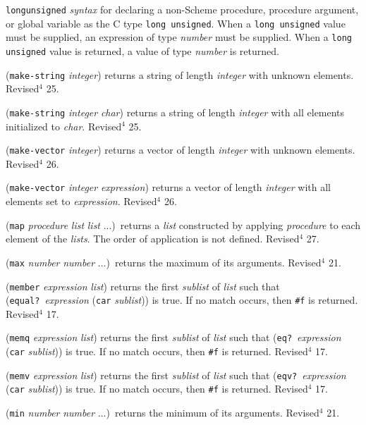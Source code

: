\documentclass[10pt,twocolumn]{article}
\begin{document}
\texttt{longunsigned} \emph{syntax} for declaring a non-Scheme procedure,
procedure argument, or global variable as the C type \texttt{long
unsigned}. When a \texttt{long unsigned} value must be supplied, an
expression of type \emph{number} must be supplied.  When a \texttt{long
unsigned} value is returned, a value of type \emph{number} is returned.

(\texttt{make-string} \emph{integer}) returns a string of length \emph{integer}
with unknown elements.  Revised$^4$ 25.

(\texttt{make-string} \emph{integer} \emph{char}) returns a string of length
\emph{integer} with all elements initialized to \emph{char}.  Revised$^4$
25.

(\texttt{make-vector} \emph{integer}) returns a vector of length \emph{integer}
with unknown elements.  Revised$^4$ 26.

(\texttt{make-vector} \emph{integer} \emph{expression}) returns a vector of
length \emph{integer} with all elements set to \emph{expression}.
Revised$^4$ 26.

(\texttt{map} \emph{procedure} \emph{list} \emph{list} ...)\ returns a \emph{list}
constructed by applying \emph{procedure} to each element of the
\emph{lists}.  The order of application is not defined.  Revised$^4$
27.

(\texttt{max} \emph{number} \emph{number} ...)\ returns the maximum of its
arguments.  Revised$^4$ 21.

(\texttt{member} \emph{expression} \emph{list}) returns the first \emph{sublist} of
\emph{list} such that (\texttt{equal?}\ \emph{expression} (\texttt{car}
\emph{sublist})) is true. If no match occurs, then \texttt{\#f} is returned.
Revised$^4$ 17.

(\texttt{memq} \emph{expression} \emph{list}) returns the first \emph{sublist} of
\emph{list} such that (\texttt{eq?}\ \emph{expression} (\texttt{car} \emph{sublist})) is
true. If no match occurs, then \texttt{\#f} is returned.  Revised$^4$ 17.

(\texttt{memv} \emph{expression} \emph{list}) returns the first \emph{sublist} of
\emph{list} such that (\texttt{eqv?}\ \emph{expression} (\texttt{car} \emph{sublist})) is
true. If no match occurs, then \texttt{\#f} is returned.  Revised$^4$ 17.

(\texttt{min} \emph{number} \emph{number} ...)\ returns the minimum of its
arguments.  Revised$^4$ 21.
\end{document}
